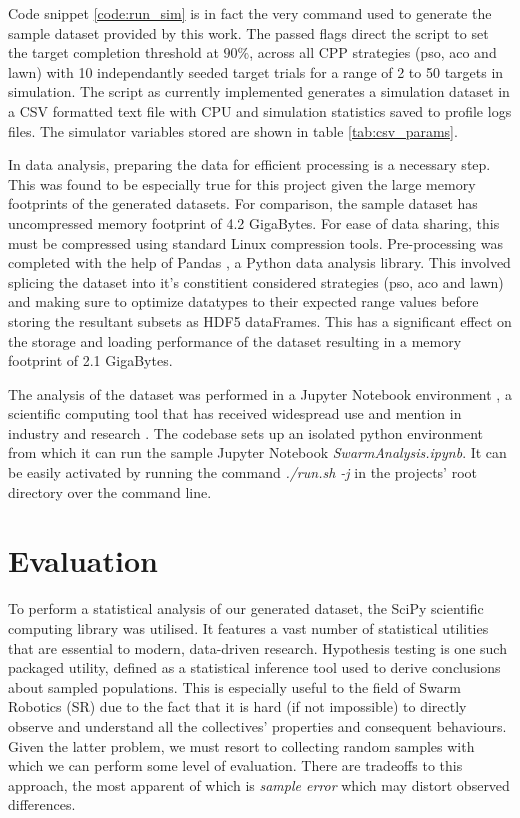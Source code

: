 \documentclass{report}
\begin{document}
Code snippet \ref{code:run_sim} is in fact the very command used to generate the sample dataset provided by this work. The passed flags direct the script to set the target completion threshold at $90\%$, across all CPP strategies (pso, aco and lawn) with 10 independantly seeded target trials for a range of 2 to 50 targets in simulation. The script as currently implemented generates a simulation dataset in a CSV formatted text file with CPU and simulation statistics saved to profile logs files. The simulator variables stored are shown in table \ref{tab:csv_params}.

In data analysis, preparing the data for efficient processing is a necessary step. This was found to be especially true for this project given the large memory footprints of the generated datasets. For comparison, the sample dataset has uncompressed memory footprint of 4.2 GigaBytes. For ease of data sharing, this must be compressed using standard Linux compression tools. Pre-processing was completed with the help of Pandas \cite{Pandas}, a Python data analysis library. This involved splicing the dataset into it's constitient considered strategies (pso, aco and lawn) and making sure to optimize datatypes to their expected range values before storing the resultant subsets as HDF5 dataFrames. This has a significant effect on the storage and loading performance of the dataset resulting in a memory footprint of 2.1 GigaBytes.

The analysis of the dataset was performed in a Jupyter Notebook environment \cite{Jupyter}, a scientific computing tool that has received widespread use and mention in industry and research \cite{Helen2014} \cite{ACM2017}. The codebase sets up an isolated python environment from which it can run the sample Jupyter Notebook \textit{SwarmAnalysis.ipynb}. It can be easily activated by running the command \textit{./run.sh -j} in the projects' root directory over the command line.

\chapter{Evaluation} \label{evaluation}

To perform a statistical analysis of our generated dataset, the SciPy \cite{SCIPY} scientific computing library was utilised. It features a vast number of statistical utilities that are essential to modern, data-driven research. Hypothesis testing is one such packaged utility, defined as a statistical inference tool used to derive conclusions about sampled populations. This is especially useful to the field of Swarm Robotics (SR) due to the fact that it is hard (if not impossible) to directly observe and understand all the collectives' properties and consequent behaviours. Given the latter problem, we must resort to collecting random samples with which we can perform some level of evaluation. There are tradeoffs to this approach, the most apparent of which is \textit{sample error} which may distort observed differences.
\end{document}
